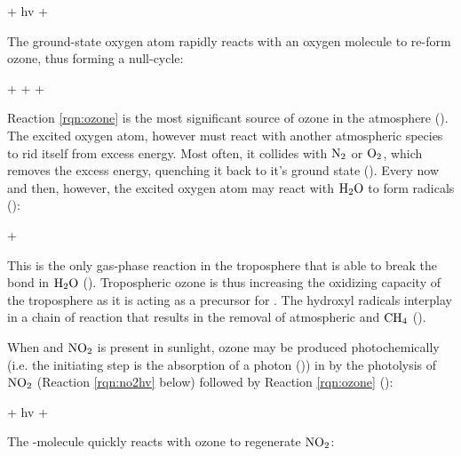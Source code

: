 \begin{reaction}
     + hv \rightarrow {} + 
    \label{rqn:excited_O2}
\end{reaction}

The ground-state oxygen atom rapidly reacts with an oxygen molecule to re-form ozone, thus forming a null-cycle:

\begin{reaction}
     +  +  \rightarrow {} + 
    \label{rqn:ozone}
\end{reaction}

Reaction \ref{rqn:ozone} is the most significant source of ozone in the atmosphere (\cite{SeinfeldSpyros}). The excited oxygen atom, however must react with another atmospheric species to rid itself from excess energy. Most often, it collides with $\mathrm{N_2}$ or $\mathrm{O_2}$, which removes the excess energy, quenching it back to it's ground state (\cite{Levy1971}). Every now and then, however, the excited oxygen atom may react with $\mathrm{H_2O}$ to form  radicals (\cite{SeinfeldSpyros}): 

\begin{reaction}
     +  
    \label{rqn:OH}
\end{reaction}

This is the only gas-phase reaction in the troposphere that is able to break the  bond in $\mathrm{H_2O}$ (\cite{SeinfeldSpyros}). Tropospheric ozone is thus increasing the oxidizing capacity of the troposphere as it is acting as a precursor for . The hydroxyl radicals interplay in a chain of reaction that results in the removal of atmospheric  and $\mathrm{CH_4}$ (\cite{Levy1971}). 

\medskip

When  and $\mathrm{NO_2}$ is present in sunlight, ozone may be produced photochemically (i.e. the initiating step is the absorption of a photon (\cite{Cadle1970})) in by the photolysis of $\mathrm{NO_2}$ (Reaction \ref{rqn:no2hv} below) followed by Reaction \ref{rqn:ozone} (\cite{Hesstvedt1978}): 


\begin{reaction}
     + hv \rightarrow {} + 
    \label{rqn:no2hv}
\end{reaction}

The -molecule quickly reacts with ozone to regenerate $\mathrm{NO_2}$:


